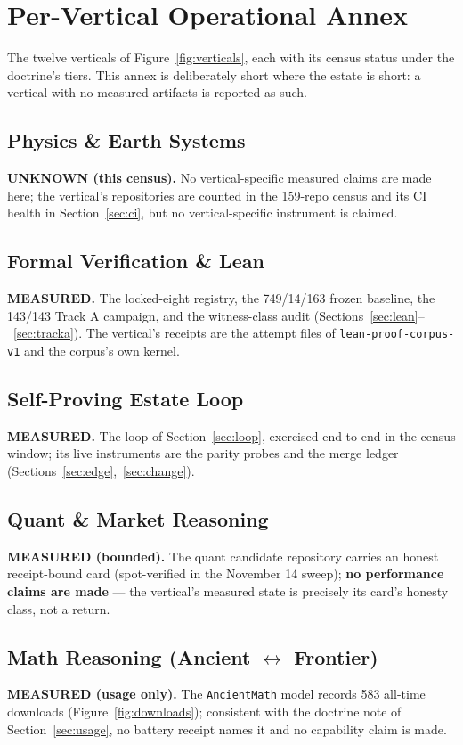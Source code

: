 \section{Per-Vertical Operational Annex}
\label{sec:annex}

The twelve verticals of Figure~\ref{fig:verticals}, each with its census status under the doctrine's tiers. This annex is deliberately short where the estate is short: a vertical with no measured artifacts is reported as such.

\subsection{Physics \& Earth Systems}
\textbf{UNKNOWN (this census).} No vertical-specific measured claims are made here; the vertical's repositories are counted in the 159-repo census and its CI health in Section~\ref{sec:ci}, but no vertical-specific instrument is claimed.

\subsection{Formal Verification \& Lean}
\textbf{MEASURED.} The locked-eight registry, the 749/14/163 frozen baseline, the 143/143 Track A campaign, and the witness-class audit (Sections~\ref{sec:lean}--~\ref{sec:tracka}). The vertical's receipts are the attempt files of \texttt{lean-proof-corpus-v1} and the corpus's own kernel.

\subsection{Self-Proving Estate Loop}
\textbf{MEASURED.} The loop of Section~\ref{sec:loop}, exercised end-to-end in the census window; its live instruments are the parity probes and the merge ledger (Sections~\ref{sec:edge},~\ref{sec:change}).

\subsection{Quant \& Market Reasoning}
\textbf{MEASURED (bounded).} The quant candidate repository carries an honest receipt-bound card (spot-verified in the November 14 sweep); \textbf{no performance claims are made} --- the vertical's measured state is precisely its card's honesty class, not a return.

\subsection{Math Reasoning (Ancient $\leftrightarrow$ Frontier)}
\textbf{MEASURED (usage only).} The \texttt{AncientMath} model records 583 all-time downloads (Figure~\ref{fig:downloads}); consistent with the doctrine note of Section~\ref{sec:usage}, no battery receipt names it and no capability claim is made.

